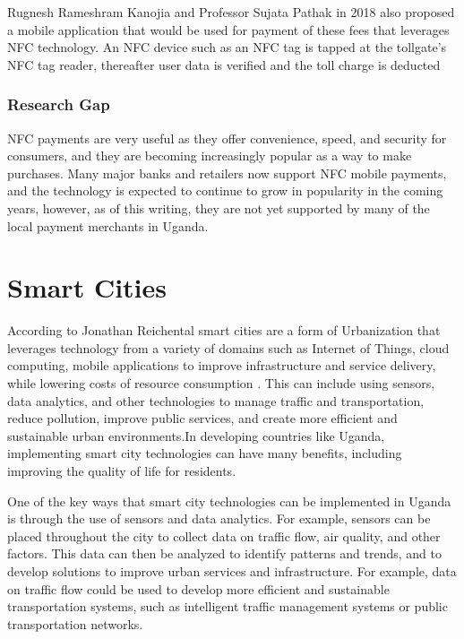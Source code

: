 Rugnesh Rameshram Kanojia and Professor Sujata Pathak in 2018 also proposed a mobile application that would be used for payment of these fees that leverages NFC technology\cite{kanojia_secured_2018}.
An NFC device such as an NFC tag is tapped at the tollgate's NFC tag reader, thereafter user data is verified and the toll charge is deducted

\subsubsection{Research Gap}
NFC payments are very useful as they offer convenience, speed, and security for consumers, and they are becoming increasingly popular as a way to make purchases. Many major banks and retailers now support NFC mobile payments, and the technology is expected to continue to grow in popularity in the coming years, however, as of this writing, they are not yet supported by many of the local payment merchants in Uganda.

\clearpage


\section{Smart Cities}
According to Jonathan Reichental smart cities are a form of Urbanization that leverages technology from a variety of domains such as Internet of Things, cloud computing, mobile applications to improve infrastructure and service delivery, while lowering costs of resource consumption \cite{geng_strategic_2016}. This can include using sensors, data analytics, and other technologies to manage traffic and transportation, reduce pollution, improve public services, and create more efficient and sustainable urban environments.In developing countries like Uganda, implementing smart city technologies can have many benefits, including improving the quality of life for residents.

One of the key ways that smart city technologies can be implemented in Uganda is through the use of sensors and data analytics. For example, sensors can be placed throughout the city to collect data on traffic flow, air quality, and other factors. This data can then be analyzed to identify patterns and trends, and to develop solutions to improve urban services and infrastructure. For example, data on traffic flow could be used to develop more efficient and sustainable transportation systems, such as intelligent traffic management systems or public transportation networks\cite{stimmel_building_2015}.

